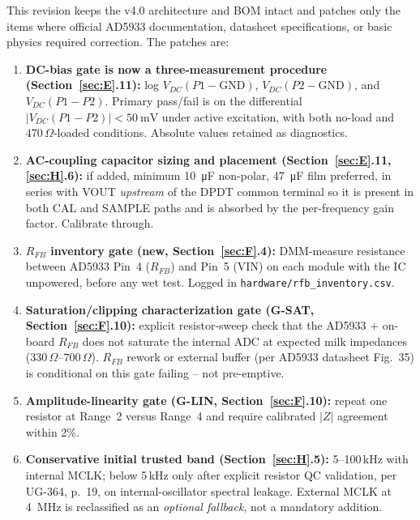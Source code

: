 \documentclass[11pt,a4paper]{article}
\newcommand{\Rohm}[1]{\ensuremath{#1\,\Omega}}
\begin{document}
\begin{tcolorbox}[enhanced, colback=EISIce, colframe=EISNavy, boxrule=0.8pt, arc=2mm,
  left=2mm,right=2mm,top=1.5mm,bottom=1.5mm,
  title=\textbf{v4.0b Technical Patch Summary (what changed since v4.0)},
  coltitle=white, colbacktitle=EISNavy]
This revision keeps the v4.0 architecture and BOM intact and patches only the items where official AD5933 documentation, datasheet specifications, or basic physics required correction. The patches are:
\begin{enumerate}[topsep=2pt,itemsep=1pt,leftmargin=1.4em]
\item \textbf{DC-bias gate is now a three-measurement procedure (Section~\ref{sec:E}.11):} log $V_{DC}(P1\!-\!\mathrm{GND})$, $V_{DC}(P2\!-\!\mathrm{GND})$, and $V_{DC}(P1\!-\!P2)$. Primary pass/fail is on the differential $|V_{DC}(P1\!-\!P2)|<\SI{50}{\milli\volt}$ under active excitation, with both no-load and \Rohm{470}-loaded conditions. Absolute values retained as diagnostics.
\item \textbf{AC-coupling capacitor sizing and placement (Section~\ref{sec:E}.11, \ref{sec:H}.6):} if added, minimum \SI{10}{\micro\farad} non-polar, \SI{47}{\micro\farad} film preferred, in series with VOUT \emph{upstream} of the DPDT common terminal so it is present in both CAL and SAMPLE paths and is absorbed by the per-frequency gain factor. Calibrate through.
\item \textbf{$R_{FB}$ inventory gate (new, Section~\ref{sec:F}.4):} DMM-measure resistance between AD5933 Pin~4 ($R_{FB}$) and Pin~5 (VIN) on each module with the IC unpowered, before any wet test. Logged in \texttt{hardware/rfb\_inventory.csv}.
\item \textbf{Saturation/clipping characterization gate (G-SAT, Section~\ref{sec:F}.10):} explicit resistor-sweep check that the AD5933 + on-board $R_{FB}$ does not saturate the internal ADC at expected milk impedances ($\Rohm{330}$--$\Rohm{700}$). $R_{FB}$ rework or external buffer (per AD5933 datasheet Fig.~35) is conditional on this gate failing -- not pre-emptive.
\item \textbf{Amplitude-linearity gate (G-LIN, Section~\ref{sec:F}.10):} repeat one resistor at Range~2 versus Range~4 and require calibrated $|Z|$ agreement within 2\%.
\item \textbf{Conservative initial trusted band (Section~\ref{sec:H}.5):} 5--100\,kHz with internal MCLK; below 5\,kHz only after explicit resistor QC validation, per UG-364, p.~19, on internal-oscillator spectral leakage. External MCLK at \SI{4}{\mega\hertz} is reclassified as an \emph{optional fallback}, not a mandatory addition.

\end{enumerate}
\end{tcolorbox}
\end{document}

